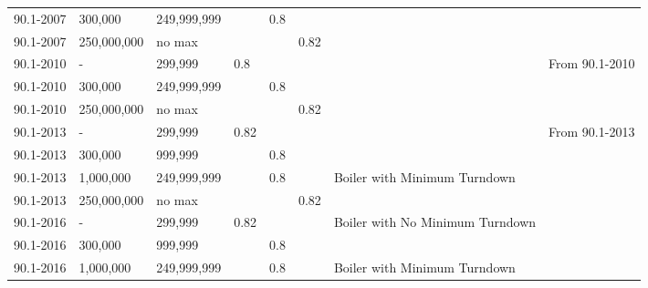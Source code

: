 \begin{table}[htbp]
\begin{tabular}{|p{0.5in}|p{0.5in}|p{1.7cm}|p{0.5in}|p{0.5in}|p{0.5in}|p{1in}|p{0.5in}|}
90.1-2007           & 300,000     & 249,999,999   &      & 0.8  &      &                                                     &                                   \\ \cline{1-6}
90.1-2007           & 250,000,000 & no max &      &      & 0.82 &                                                     &                                   \\ \cline{1-6} \cline{8-8} 
90.1-2010           & -           & 299,999       & 0.8  &      &      &                                                     & \multirow{3}{*}{\parbox{0.5in}{From   90.1-2010}} \\ \cline{1-6}
90.1-2010           & 300,000     & 249,999,999   &      & 0.8  &      &                                                     &                                   \\ \cline{1-6}
90.1-2010           & 250,000,000 & no max &      &      & 0.82 &                                                     &                                   \\ \cline{1-6} \cline{8-8} 
90.1-2013           & -           & 299,999       & 0.82 &      &      &                                                     & \multirow{8}{*}{\parbox{0.5in}{From   90.1-2013}} \\ \cline{1-6}
90.1-2013           & 300,000     & 999,999       &      & 0.8  &      &                                                     &                                   \\ \cline{1-7}
90.1-2013           & 1,000,000   & 249,999,999   &      & 0.8  &      & \multirow{2}{*}{\parbox{1in}{Boiler with Minimum Turndown}}     &                                   \\ \cline{1-6}
90.1-2013           & 250,000,000 & no max &      &      & 0.82 &                                                     &                                   \\ \cline{1-7}
90.1-2016           & -           & 299,999       & 0.82 &      &      & \multirow{2}{*}{\parbox{1in}{Boiler with No Minimum Turndown}}  & \multirow{4}{*}{\parbox{0.5in}{From   90.1-2016}} \\ \cline{1-6}
90.1-2016           & 300,000     & 999,999       &      & 0.8  &      &                                                     &                                   \\ \cline{1-7}
90.1-2016           & 1,000,000   & 249,999,999   &      & 0.8  &      & \multirow{2}{*}{\parbox{1in}{Boiler with Minimum Turndown}}     &                                   \\ \cline{1-6}

\end{tabular}
\end{table}
